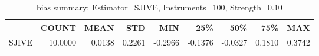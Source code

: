\begin{table}[ht]
\centering
\caption{bias summary: Estimator=SJIVE, Instruments=100, Strength=0.10}
\begin{tabular}{lrrrrrrrr}
\toprule
 & COUNT & MEAN & STD & MIN & 25\% & 50\% & 75\% & MAX \\
\midrule
SJIVE & 10.0000 & 0.0138 & 0.2261 & -0.2966 & -0.1376 & -0.0327 & 0.1810 & 0.3742 \\
\bottomrule
\end{tabular}
\end{table}
